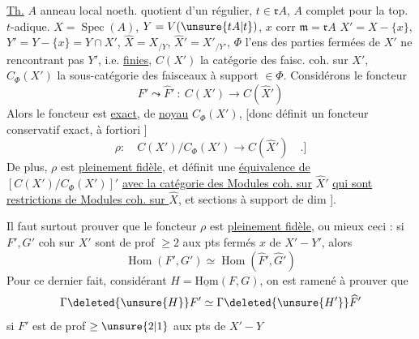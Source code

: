 \uline{Th.} $A$ anneau local noeth. quotient d'un régulier, $t\in\mathfrak{r} A$, $A$ complet pour la top. $t$-adique. $X=\operatorname{Spec}(A)$, $Y=V(\unsure{tA|t})$, $x$ corr $\mathfrak{m}=\mathfrak{r} A$ $X'=X-\{x\}$, $Y'=Y-\{x\}=Y\cap X'$, $\widehat X=X_{/Y}$, $\widehat X'=X'_{/Y'}$, $\Phi$ l'ens des parties fermées de $X'$ ne rencontrant pas $Y'$, i.e. \uline{finies}, $C(X')$ la catégorie des faisc. coh. sur $X'$, $C_\Phi(X')$ la sous-catégorie des faisceaux à support $\in\Phi$. Considérons le foncteur 
\[
 F'\leadsto\widehat F'\ :\ C(X')\longrightarrow C(\widehat X')
\]
Alors le foncteur est \uline{exact}, de \uline{noyau} $C_\Phi(X')$, [donc définit un foncteur conservatif exact, à fortiori ]
\[
 \rho:\quad C(X')/C_\Phi(X')\longrightarrow C(\widehat X')\quad\text{.]}
\]
De plus, $\rho$ est \uline{pleinement fidèle},  et définit une \uline{équivalence de} $[C(X')/C_\Phi(X')]'$ \uline{avec la catégorie des Modules coh. sur} $\widehat X'$ \uline{qui sont}  \uline{restrictions de Modules coh. sur $\widehat X$}, et    sections   à support de dim ].


Il faut surtout prouver que le foncteur $\rho$ est \uline{pleinement fidèle}, ou mieux ceci : si $F',G'$  coh sur $X'$ sont de prof $\geq2$ aux pts  fermés $x$ de $X'-Y'$,  alors
\[
 \operatorname{Hom}(F',G')\simeq\operatorname{Hom}(\widehat F',\widehat G')
\]
Pour ce dernier fait, considérant $H=\operatorname{\underline{Hom}}(F,G)$, on est ramené à prouver que
\[
 \Gamma\deleted{\unsure{H}}F'\simeq\Gamma\deleted{\unsure{H'}}\widehat F'
\]
si $F'$ est de prof $\geq\unsure{2|1}$ aux pts  de $X'-Y$
